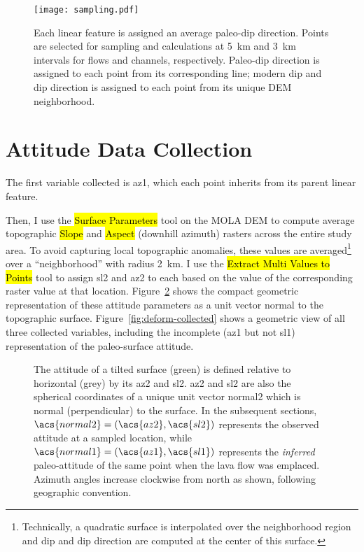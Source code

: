 \begin{figure}
    \centering
    \texttt{[image: sampling.pdf]}
    \caption[Sampling site selection]{Each linear feature is assigned an average paleo-dip direction. Points are selected for sampling and calculations at \qty{5}{\km} and \qty{3}{\km} intervals for flows and channels, respectively. Paleo-dip direction is assigned to each point from its corresponding line; modern dip and dip direction is assigned to each point from its unique \ac{DEM} neighborhood.}
    \label{fig:sampling}
\end{figure}

\section{Attitude Data Collection}

\newcommand{\neighborhood}{\qty{2}{\km}}

The first variable collected is \acf{az1}, which each point inherits from its parent linear feature.

Then, I use the \hl{Surface Parameters} tool on the \ac{MOLA} \ac{DEM} to compute average topographic \hl{Slope} and \hl{Aspect} (downhill azimuth) rasters across the entire study area. To avoid capturing local topographic anomalies, these values are averaged\footnote{Technically, a quadratic surface is interpolated over the neighborhood region and dip and dip direction are computed at the center of this surface.} over a ``neighborhood'' with radius \neighborhood. I use the \hl{Extract Multi Values to Points} tool to assign \acf{sl2} and \acf{az2} to each based on the value of the corresponding raster value at that location. Figure~\ref{fig:surface} shows the compact geometric representation of these attitude parameters as a unit vector normal to the topographic surface. Figure~\ref{fig:deform-collected} shows a geometric view of all three collected variables, including the incomplete (\acs{az1} but not \acs{sl1}) representation of the paleo-surface attitude.

\begin{figure}
    {\caption[Attitude as a normal vector $\acs{normal2}=(\acs{az2},\acs{sl2})$]{The attitude of a tilted surface (green) is defined relative to horizontal (grey) by its \acf{az2} and \acf{sl2}. \acs{az2} and \acs{sl2} are also the spherical coordinates of a unique unit vector \acs{normal2} which is normal (perpendicular) to the surface. In the subsequent sections, $\acs{normal2}=(\acs{az2},\acs{sl2})$ represents the observed attitude at a sampled location, while $\acs{normal1}=(\acs{az1},\acs{sl1})$ represents the \emph{inferred} paleo-attitude of the same point when the lava flow was emplaced. Azimuth angles increase clockwise from \acf{north} as shown, following geographic convention.}\label{fig:surface}}
    {}
\end{figure}

